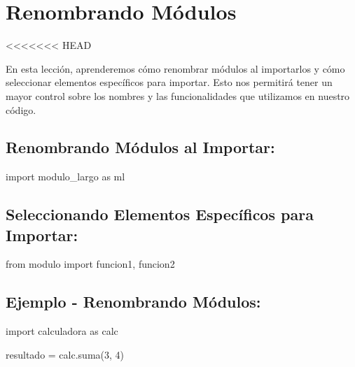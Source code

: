 \documentclass[
  a4paper,
  onepage,
  openany]{scrreprt}
\newenvironment{Shaded}{\begin{snugshade}}{\end{snugshade}}
\newcommand{\DecValTok}[1]{\textcolor[rgb]{0.68,0.00,0.00}{#1}}
\newcommand{\ImportTok}[1]{\textcolor[rgb]{0.00,0.46,0.62}{#1}}
\newcommand{\NormalTok}[1]{\textcolor[rgb]{0.00,0.23,0.31}{#1}}
\newcommand{\OperatorTok}[1]{\textcolor[rgb]{0.37,0.37,0.37}{#1}}
\begin{document}
\hypertarget{renombrando-muxf3dulos}{%
\chapter{Renombrando Módulos}\label{renombrando-muxf3dulos}}

\textless\textless\textless\textless\textless\textless\textless{} HEAD

En esta lección, aprenderemos cómo renombrar módulos al importarlos y
cómo seleccionar elementos específicos para importar. Esto nos permitirá
tener un mayor control sobre los nombres y las funcionalidades que
utilizamos en nuestro código.

\hypertarget{renombrando-muxf3dulos-al-importar}{%
\section{Renombrando Módulos al
Importar:}\label{renombrando-muxf3dulos-al-importar}}

\begin{Shaded}
\begin{Highlighting}[]
\ImportTok{import}\NormalTok{ modulo\_largo }\ImportTok{as}\NormalTok{ ml}
\end{Highlighting}
\end{Shaded}

\hypertarget{seleccionando-elementos-especuxedficos-para-importar}{%
\section{Seleccionando Elementos Específicos para
Importar:}\label{seleccionando-elementos-especuxedficos-para-importar}}

\begin{Shaded}
\begin{Highlighting}[]
\ImportTok{from}\NormalTok{ modulo }\ImportTok{import}\NormalTok{ funcion1, funcion2}
\end{Highlighting}
\end{Shaded}

\hypertarget{ejemplo---renombrando-muxf3dulos}{%
\section{Ejemplo - Renombrando
Módulos:}\label{ejemplo---renombrando-muxf3dulos}}

\begin{Shaded}
\begin{Highlighting}[]
\ImportTok{import}\NormalTok{ calculadora }\ImportTok{as}\NormalTok{ calc}

\NormalTok{resultado }\OperatorTok{=}\NormalTok{ calc.suma(}\DecValTok{3}\NormalTok{, }\DecValTok{4}\NormalTok{)}
\end{Highlighting}
\end{Shaded}
\end{document}
